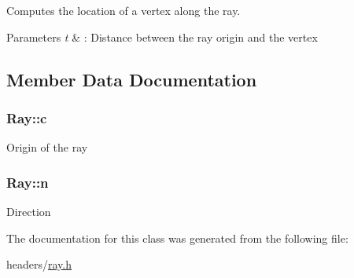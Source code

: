 \-Computes the location of a vertex along the ray. 


\begin{DoxyParams}{\-Parameters}
{\em t} & \-: \-Distance between the ray origin and the vertex \\
\hline
\end{DoxyParams}


\subsection{\-Member \-Data \-Documentation}
\hypertarget{class_ray_a2e41a40406edbbb3103ca0734a435c08}{
\subsubsection[{c}]{ {\bf \-Ray\-::c}}}
\label{class_ray_a2e41a40406edbbb3103ca0734a435c08}
\-Origin of the ray \hypertarget{class_ray_a70e0d3a943faf00a399e432c386fd146}{
\subsubsection[{n}]{ {\bf \-Ray\-::n}}}
\label{class_ray_a70e0d3a943faf00a399e432c386fd146}
\-Direction 

\-The documentation for this class was generated from the following file\-:\begin{DoxyCompactItemize}
\item 
headers/\hyperlink{ray_8h}{ray.\-h}\end{DoxyCompactItemize}
